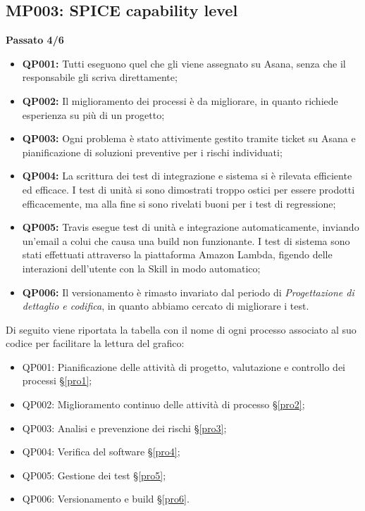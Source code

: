 \subsection{MP003: SPICE capability level}
\textbf{Passato 4/6}
\begin{itemize}
	\item \textbf{QP001:} Tutti eseguono quel che gli viene assegnato su Asana, senza che il responsabile gli scriva direttamente;
	\item \textbf{QP002:} Il miglioramento dei processi è da migliorare, in quanto richiede esperienza su più di un progetto;
	\item \textbf{QP003:} Ogni problema è stato attivimente gestito tramite ticket su Asana e pianificazione di soluzioni preventive per i rischi individuati;
	\item \textbf{QP004:} La scrittura dei test di integrazione e sistema si è rilevata efficiente ed efficace. I test di unità si sono dimostrati troppo ostici per essere prodotti efficacemente, ma alla fine si sono rivelati buoni per i test di regressione;
	\item \textbf{QP005:} Travis esegue test di unità e integrazione automaticamente, inviando un'email a colui che causa una build non funzionante. I test di sistema sono stati effettuati attraverso la piattaforma Amazon Lambda, figendo delle interazioni dell'utente con la Skill in modo automatico;
	\item \textbf{QP006:} Il versionamento è rimasto invariato dal periodo di \textit{Progettazione di dettaglio e codifica}, in quanto abbiamo cercato di migliorare i test.
\end{itemize}
Di seguito viene riportata la tabella con il nome di ogni processo associato al suo codice per facilitare la lettura del grafico:
\begin{itemize}
	\item QP001: Pianificazione delle attività di progetto, valutazione e controllo dei processi \S\ref{pro1};
	\item QP002: Miglioramento continuo delle attività di processo \S\ref{pro2};
	\item QP003: Analisi e prevenzione dei rischi \S\ref{pro3};
	\item QP004: Verifica del software \S\ref{pro4};
	\item QP005: Gestione dei test \S\ref{pro5};
	\item QP006: Versionamento e build \S\ref{pro6}.
\end{itemize}
